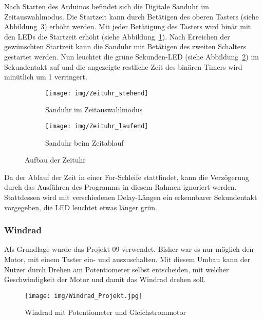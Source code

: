 Nach Starten des Arduinos befindet sich die Digitale Sanduhr im Zeitauswahlmodus. Die Startzeit kann durch Betätigen des oberen Tasters (siehe Abbildung~\ref{Zeituhr}) erhöht werden. Mit jeder Betätigung des Tasters wird binär mit den LEDs die Startzeit erhöht (siehe Abbildung~\ref{stehend}). Nach Erreichen der gewünschten Startzeit kann die Sanduhr mit Betätigen des zweiten Schalters gestartet werden. Nun leuchtet die grüne Sekunden-LED (siehe Abbildung~\ref{laufend}) im Sekundentakt auf und die angezeigte restliche Zeit des binären Timers wird minütlich um 1 verringert.\\

\begin{figure}[h]
	\centering
	\begin{subfigure}[b]{0.48\linewidth}
		\centering
		\texttt{[image: img/Zeituhr\_stehend]}
		\caption{Sanduhr im Zeitauswahlmodus}\label{stehend}
	\end{subfigure}\enspace%
	\begin{subfigure}[b]{0.48\linewidth}
		\centering
		\texttt{[image: img/Zeituhr\_laufend]}
		\caption{Sanduhr beim Zeitablauf}\label{laufend}
	\end{subfigure}
	\caption{Aufbau der Zeituhr}\label{Zeituhr}
\end{figure}

Da der Ablauf der Zeit in einer For-Schleife stattfindet, kann die Verzögerung durch das Ausführen des Programms in diesem Rahmen ignoriert werden. Stattdessen wird mit verschiedenen Delay-Längen ein erkennbarer Sekundentakt vorgegeben, die LED leuchtet etwas länger grün. 

\subsubsection{Windrad}

 Als Grundlage wurde das Projekt 09 \autocite{arduino} verwendet. Bisher war es nur möglich den Motor, mit einem Taster ein- und auszuschalten. Mit diesem Umbau kann der Nutzer durch Drehen am Potentiometer selbst entscheiden, mit welcher Geschwindigkeit der Motor und damit das Windrad drehen soll.
\\

\begin{figure}[h]
\begin{center}
\texttt{[image: img/Windrad\_Projekt.jpg]}
\caption{Windrad mit Potentiometer und Gleichstrommotor}
\label{Windrad_project}
\end{center}
\end{figure}
